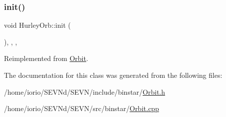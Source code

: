 \mbox{\label{class_hurley_orb_afba6609e2719852d8cf13b5046be6128}} 
\subsubsection{\texorpdfstring{init()}{init()}}
{\footnotesize\ttfamily void Hurley\+Orb\+::init (\begin{DoxyParamCaption}{ }\end{DoxyParamCaption})\hspace{0.3cm}{\ttfamily [inline]}, {\ttfamily [override]}, {\ttfamily [private]}, {\ttfamily [virtual]}}



Reimplemented from \hyperlink{class_orbit_ab92aeb9474f9aa26ea000ed2ea8c2c8c}{Orbit}.



The documentation for this class was generated from the following files\+:\begin{DoxyCompactItemize}
\item 
/home/iorio/\+S\+E\+V\+Nd/\+S\+E\+V\+N/include/binstar/\hyperlink{_orbit_8h}{Orbit.\+h}\item 
/home/iorio/\+S\+E\+V\+Nd/\+S\+E\+V\+N/src/binstar/\hyperlink{_orbit_8cpp}{Orbit.\+cpp}\end{DoxyCompactItemize}
